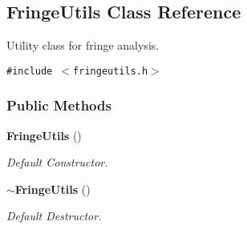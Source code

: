 \subsection{Fringe\-Utils  Class Reference}
\label{class_fringeutils}
Utility class for fringe analysis. 


{\tt \#include $<$fringeutils.h$>$}

\subsubsection*{Public Methods}
\begin{CompactItemize}
\item 
{}
{\bf Fringe\-Utils} ()\label{class_fringeutils_a0}

\begin{CompactList}\small\item\em Default Constructor.\item\end{CompactList}\item 
{}
{\bf $\sim$Fringe\-Utils} ()\label{class_fringeutils_a1}

\begin{CompactList}\small\item\em Default Destructor.\item\end{CompactList}\end{CompactItemize}
